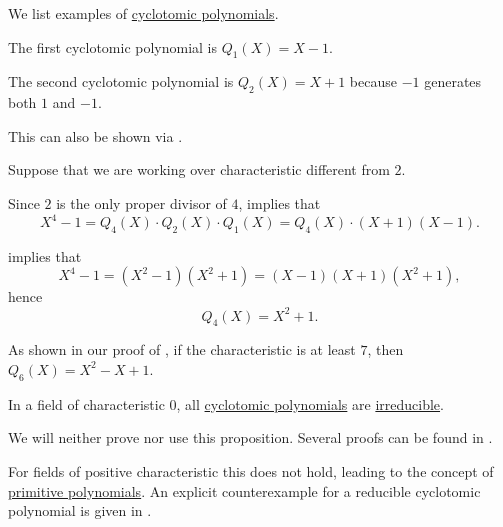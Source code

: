 \begin{example}\label{ex:def:cyclotomic_polynomial}
  We list examples of \hyperref[def:cyclotomic_polynomial]{cyclotomic polynomials}.
  \begin{thmenum}
     The first cyclotomic polynomial is \( Q_1(X) = X - 1 \).

     The second cyclotomic polynomial is \( Q_2(X) = X + 1 \) because \( -1 \) generates both \( 1 \) and \( -1 \).

    This can also be shown via .

     Suppose that we are working over characteristic different from \( 2 \).

    Since \( 2 \) is the only proper divisor of \( 4 \),  implies that
    \begin{equation*}
      X^4 - 1 = Q_4(X) \cdot Q_2(X) \cdot Q_1(X) = Q_4(X) \cdot (X + 1) (X - 1).
    \end{equation*}

     implies that
    \begin{equation*}
      X^4 - 1 = (X^2 - 1) (X^2 + 1) = (X - 1) (X + 1) (X^2 + 1),
    \end{equation*}
    hence
    \begin{equation*}
      Q_4(X) = X^2 + 1.
    \end{equation*}

     As shown in our proof of , if the characteristic is at least \( 7 \), then \( Q_6(X) = X^2 - X + 1 \).
  \end{thmenum}
\end{example}

\begin{proposition}\label{thm:cyclotomic_polynomials_irreducible}
  In a field of characteristic \( 0 \), all \hyperref[def:cyclotomic_polynomial]{cyclotomic polynomials} are \hyperref[def:domain_divisibility/irreducible]{irreducible}.
\end{proposition}
\begin{comments}
  \item We will neither prove nor use this proposition. Several proofs can be found in \cite[thm. 2]{Weintraub2013CyclotomicPolynomials}.
  \item For fields of positive characteristic this does not hold, leading to the concept of \hyperref[def:finite_field_primitive_polynomial]{primitive polynomials}. An explicit counterexample for a reducible cyclotomic polynomial is given in .
\end{comments}

